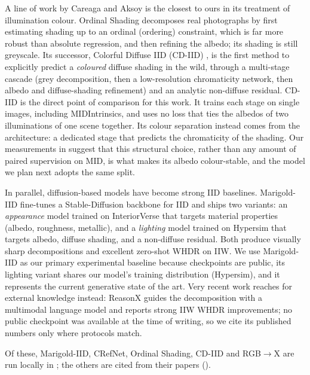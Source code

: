 A line of work by Careaga and Aksoy is the closest to ours in its treatment of
illumination colour.
Ordinal Shading  decomposes real photographs by first
estimating shading up to an ordinal (ordering) constraint, which is far more
robust than absolute regression, and then refining the albedo; its shading is
still greyscale.
Its successor, Colorful Diffuse IID (CD-IID) , is the
first method to explicitly predict a \emph{coloured} diffuse shading in the wild,
through a multi-stage cascade (grey decomposition, then a low-resolution
chromaticity network, then albedo and diffuse-shading refinement) and an analytic
non-diffuse residual.
CD-IID is the direct point of comparison for this work. It trains each stage on single
images, including MIDIntrinsics, and uses no loss that ties the albedos of two
illuminations of one scene together. Its colour separation instead comes from the
architecture: a dedicated stage that predicts the chromaticity of the shading. Our
measurements in  suggest that this structural choice, rather than
any amount of paired supervision on MID, is what makes its albedo colour-stable, and the
model we plan next adopts the same split.

In parallel, diffusion-based models have become strong IID baselines.
Marigold-IID  fine-tunes a Stable-Diffusion backbone for
IID and ships two variants: an \emph{appearance} model trained on InteriorVerse
that targets material properties (albedo, roughness, metallic), and a
\emph{lighting} model trained on Hypersim  that targets
albedo, diffuse shading, and a non-diffuse residual.
Both produce visually sharp decompositions and excellent zero-shot WHDR on IIW.
We use Marigold-IID as our primary experimental baseline because checkpoints are
public, its lighting variant shares our model's training distribution (Hypersim), and
it represents the current generative state of the art.
Very recent work reaches for external knowledge instead: ReasonX
 guides the decomposition with a multimodal language model and
reports strong IIW WHDR improvements; no public checkpoint was available at the
time of writing, so we cite its published numbers only where protocols match.

Of these, Marigold-IID, CRefNet, Ordinal Shading, CD-IID and RGB$\rightarrow$X
 are run locally in ; the others are cited from
their papers ().

